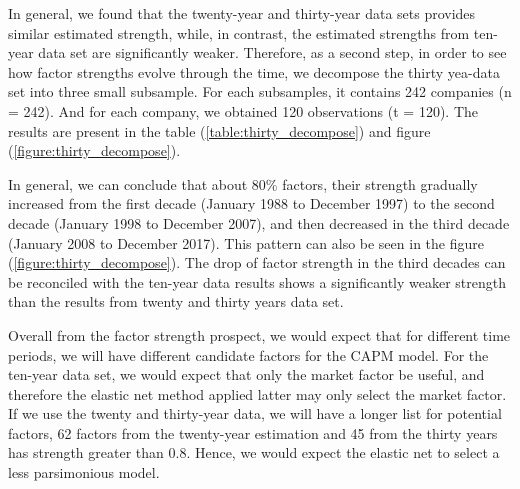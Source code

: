 In general, we found that the twenty-year and thirty-year data sets provides similar estimated strength, while, in contrast, the estimated strengths from ten-year data set are significantly weaker.
Therefore, as a second step, in order to see how factor strengths evolve through the time, we decompose the thirty yea-data set into three small subsample.
For each subsamples, it contains 242 companies (n = 242). 
And for each company, we obtained 120 observations (t = 120). 
The results are present in the table (\ref{table:thirty_decompose}) and figure (\ref{figure:thirty_decompose}).

In general, we can conclude that about 80\% factors, their strength gradually increased from the first decade (January 1988 to December 1997) to the second decade (January 1998 to December 2007), and then decreased in the third decade (January 2008 to December 2017).
This pattern can also be seen in the figure (\ref{figure:thirty_decompose}).
The drop of factor strength in the third decades can be reconciled with the ten-year data results shows a significantly weaker strength than the results from twenty and thirty years data set.





Overall from the factor strength prospect, we would expect that for different time periods, we will have different candidate factors for the CAPM model.
For the ten-year data set, we would expect that only the market factor be useful, and therefore the elastic net method applied latter may only select the market factor.
If we use the twenty and thirty-year data, we will have a longer list for potential factors, 62 factors from the twenty-year estimation and 45 from the thirty years has strength greater than 0.8.
Hence, we would expect the elastic net to select a less parsimonious model. 

